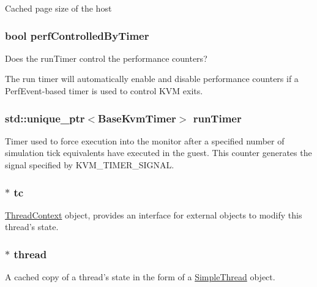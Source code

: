 \label{classBaseKvmCPU_a8386a4766759aabc32038300820a64aa}
Cached page size of the host \hypertarget{classBaseKvmCPU_a569365e1361250361be1c3f703a52914}{
\subsubsection[{perfControlledByTimer}]{\setlength{\rightskip}{0pt plus 5cm}bool {\bf perfControlledByTimer}}}
\label{classBaseKvmCPU_a569365e1361250361be1c3f703a52914}
Does the runTimer control the performance counters?

The run timer will automatically enable and disable performance counters if a PerfEvent-\/based timer is used to control KVM exits. \hypertarget{classBaseKvmCPU_a28c546a9aa908313559ed074632a0c37}{
\subsubsection[{runTimer}]{\setlength{\rightskip}{0pt plus 5cm}std::unique\_\-ptr$<${\bf BaseKvmTimer}$>$ {\bf runTimer}}}
\label{classBaseKvmCPU_a28c546a9aa908313559ed074632a0c37}
Timer used to force execution into the monitor after a specified number of simulation tick equivalents have executed in the guest. This counter generates the signal specified by KVM\_\-TIMER\_\-SIGNAL. \hypertarget{classBaseKvmCPU_a4455a4759e69e5ebe68ae7298cbcc37d}{
\subsubsection[{tc}]{$\ast$ {\bf tc}}}
\label{classBaseKvmCPU_a4455a4759e69e5ebe68ae7298cbcc37d}
\hyperlink{classThreadContext}{ThreadContext} object, provides an interface for external objects to modify this thread's state. \hypertarget{classBaseKvmCPU_af9572fa907cd21b54cb14bd626010d39}{
\subsubsection[{thread}]{$\ast$ {\bf thread}}}
\label{classBaseKvmCPU_af9572fa907cd21b54cb14bd626010d39}
A cached copy of a thread's state in the form of a \hyperlink{classSimpleThread}{SimpleThread} object.

